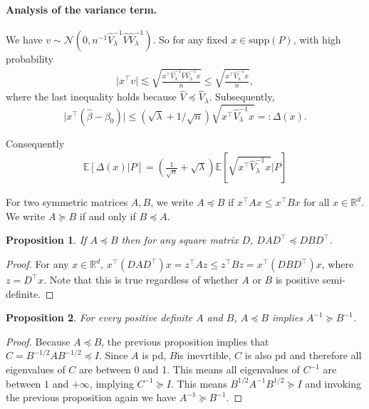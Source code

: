 \documentclass[11pt,a4paper]{article}
\renewcommand{\hat}{\widehat}
\theoremstyle{definition}
\theoremstyle{plain}
\newtheorem{proposition}{Proposition}[section]
\theoremstyle{remark}
\newcommand{\supp}{\mathrm{supp}}
\begin{document}
\paragraph{Analysis of the variance term.}
We have $v\sim \mathcal N(0, n^{-1}\hat V_\lambda^{-1}\hat V\hat V_\lambda^{-1})$. So for any fixed $x\in\supp(P)$, with high probability 
\begin{align*}
\big|x^\top v\big| \lesssim \sqrt{\frac{x^\top \hat V_\lambda^{-1}\hat V\hat V_{\lambda}^{-1}x}{n}} \leq \sqrt{\frac{x^\top\hat V_\lambda^{-1} x}{n}},
\end{align*}
where the last inequality holds because $\hat V\preceq\hat V_\lambda$. Subsequently, 
$$
\big|x^\top(\hat\beta-\beta_0)\big| \leq (\sqrt{\lambda}+1/\sqrt{n})\sqrt{x^\top\hat V_\lambda^{-1}x} =: \Delta(x).
$$

Consequently
\begin{align*}
\mathbb E[\Delta(x)|P] = \left(\frac{1}{\sqrt{n}}+\sqrt{\lambda}\right)\mathbb E[\sqrt{x^\top \hat V_\lambda^{-1}x}|P] 
\end{align*}

For two symmetric matrices $A,B$, we write $A\preceq B$ if $x^\top Ax\leq x^\top Bx$ for all $x\in\mathbb R^d$.
We write $A\succeq B$ if and only if $B\preceq A$.
\begin{proposition}
If $A\preceq B$ then for any square matrix $D$, $DAD^\top\preceq DBD^\top$.
\label{prop:1}
\end{proposition}
\begin{proof}
For any $x\in\mathbb R^d$, $x^\top (DAD^\top)x = z^\top Az \leq z^\top Bz = x^\top (DBD^\top)x$, where $z=D^\top x$.
Note that this is true regardless of whether $A$ or $B$ is positive semi-definite.
\end{proof}

\begin{proposition}
For every positive definite $A$ and $B$, $A\preceq B$ implies $A^{-1}\succeq B^{-1}$.
\label{prop:2}
\end{proposition}
\begin{proof}
Because $A\preceq B$, the previous proposition implies that $C=B^{-1/2}AB^{-1/2}\preceq I$. Since $A$ is pd, $B$is inevrtible, $C$ is also pd and therefore all eigenvalues of $C$ are between 0 and 1. This means all eigenvalues of $C^{-1}$ are between $1$ and $+\infty$, implying $C^{-1}\succeq I$. 
This means $B^{1/2}A^{-1}B^{1/2}\succeq I$ and invoking the previous proposition again we have $A^{-1}\succeq B^{-1}$.
\end{proof}
\end{document}
